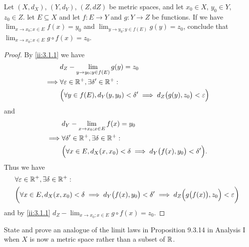 \begin{ex}\label{ii:ex:3.1.5}
  Let \((X, d_X)\), \((Y, d_Y)\), \((Z, d Z)\) be metric spaces, and let \(x_0 \in X\), \(y_0 \in Y\), \(z_0 \in Z\).
  let \(E \subseteq X\) and let \(f : E \to Y\) and \(g : Y \to Z\) be functions.
  If we have \(\lim_{x \to x_0 ; x \in E} f(x) = y_0\) and \(\lim_{y \to y_0 ; y \in f(E)} g(y) = z_0\), conclude that \(\lim_{x \to x_0 ; x \in E} g \circ f(x) = z_0\).
\end{ex}

\begin{proof}
  By \cref{ii:3.1.1} we have
  \begin{align*}
             & d_Z - \lim_{y \to y_0 ; y \in f(E)} g(y) = z_0                                                    \\
    \implies & \forall \varepsilon \in \mathbb{R}^+, \exists \delta' \in \mathbb{R}^+ :                                          \\
             & \Big(\forall y \in f(E), d_Y(y, y_0) < \delta' \implies d_Z\big(g(y), z_0\big) < \varepsilon\Big)
  \end{align*}
  and
  \begin{align*}
             & d_Y - \lim_{x \to x_0 ; x \in E} f(x) = y_0                                                \\
    \implies & \forall \delta' \in \mathbb{R}^+, \exists \delta \in \mathbb{R}^+ :                                        \\
             & \Big(\forall x \in E, d_X(x, x_0) < \delta \implies d_Y\big(f(x), y_0\big) < \delta'\Big).
  \end{align*}
  Thus we have
  \begin{align*}
     & \forall \varepsilon \in \mathbb{R}^+, \exists \delta \in \mathbb{R}^+ :                                                                                              \\
     & \bigg(\forall x \in E, d_X(x, x_0) < \delta \implies d_Y\big(f(x), y_0\big) < \delta' \implies d_Z\Big(g\big(f(x)\big), z_0\Big) < \varepsilon\bigg)
  \end{align*}
  and by \cref{ii:3.1.1} \(d_Z - \lim_{x \to x_0 ; x \in E} g \circ f(x) = z_0\).
\end{proof}

\begin{ex}\label{ii:ex:3.1.6}
  State and prove an analogue of the limit laws in Proposition 9.3.14 in Analysis I when \(X\) is now a metric space rather than a subset of \(\mathbb{R}\).
\end{ex}

